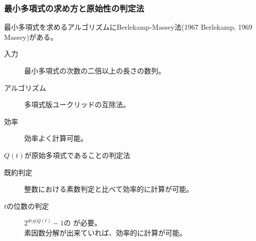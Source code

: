 \documentclass[cjk, dvips, handout, trans, xcolor=dvipsnames]{beamer}
\begin{document}
\begin{frame}[t]
  \frametitle{最小多項式の求め方と原始性の判定法}
  最小多項式を求めるアルゴリズムにBerlekamp-Massey法(1967 Berlekamp,
  1969 Massey)がある。
  \begin{description}
  \item[入力] 最小多項式の次数の二倍以上の長さの数列。
  \item[アルゴリズム] 多項式版ユークリッドの互除法。
  \item[効率] 効率よく計算可能。
  \end{description}

  \pause
  \vspace{\baselineskip}
  $Q(t)$が原始多項式であることの判定法
  \begin{description}
  \item[既約判定] 整数における素数判定と比べて効率的に計算が可能。
  \item[$t$の位数の判定] $2^{deg(Q(t)}-1$の
    が必要。\\
    素因数分解が出来ていれば、効率的に計算が可能。
  \end{description}



\end{frame}
\end{document}
